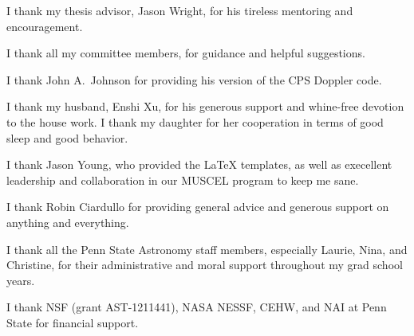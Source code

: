 I thank my thesis advisor, Jason Wright, for his tireless mentoring
and encouragement.

I thank all my committee members, for guidance and helpful suggestions.

I thank John A.\ Johnson for providing his version of the CPS Doppler code.

I thank my husband, Enshi Xu, for his generous support and whine-free
devotion to the house work. I thank my daughter for her cooperation in
terms of good sleep and good behavior.

I thank Jason Young, who provided the LaTeX templates, as well as
execellent leadership and collaboration in our MUSCEL program to keep me sane.

I thank Robin Ciardullo for providing general advice and generous
support on anything and everything. 

I thank all the Penn State Astronomy staff members, especially Laurie, Nina,
and Christine, for their administrative and moral support throughout
my grad school years.

I thank NSF (grant AST-1211441), NASA NESSF, CEHW, and NAI at Penn State for financial
support. 
